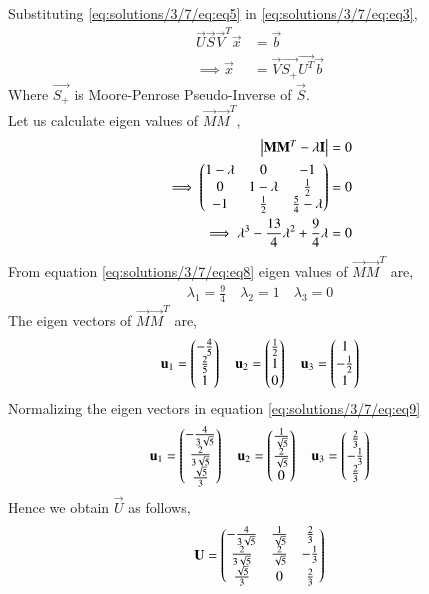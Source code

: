 Substituting \eqref{eq:solutions/3/7/eq:eq5} in \eqref{eq:solutions/3/7/eq:eq3},
\begin{align}
\vec{U}\vec{S}\vec{V}^T\vec{x} & = \vec{b}\\
\implies\vec{x} &= \vec{V}\vec{S_+}\vec{U^T}\vec{b}\label{eq:solutions/3/7/eq:eq7}
\end{align}
Where $\vec{S_+}$ is Moore-Penrose Pseudo-Inverse of $\vec{S}$. \\
Let us calculate eigen values of $\vec{M}\vec{M}^T$,
\begin{align}
\begin{vmatrix}\mathbf{M}\mathbf{M}^T - \lambda\mathbf{I}\end{vmatrix} &= 0\\
\implies\begin{pmatrix}1-\lambda&0&-1\\0&1-\lambda&\frac{1}{2}\\-1&\frac{1}{2}&\frac{5}{4}-\lambda\end{pmatrix} &=0\\
\implies\lambda^3-\frac{13}{4}\lambda^2+\frac{9}{4}\lambda &=0 \label{eq:solutions/3/7/eq:eq8}
\end{align}
From equation \eqref{eq:solutions/3/7/eq:eq8} eigen values of $\vec{M}\vec{M}^T$ are,
\begin{align}
\lambda_1 = \frac{9}{4} \quad
\lambda_2 = 1 \quad
\lambda_3 = 0
\end{align}
The eigen vectors of $\vec{M}\vec{M}^T$ are,
\begin{align}
\mathbf{u}_1=\begin{pmatrix}-\frac{4}{5}\\\frac{2}{5}\\1\end{pmatrix}\quad
\mathbf{u}_2=\begin{pmatrix}\frac{1}{2}\\1\\0\end{pmatrix}\quad
\mathbf{u}_3=\begin{pmatrix}1\\-\frac{1}{2}\\1\end{pmatrix}\label{eq:solutions/3/7/eq:eq9}
\end{align}
Normalizing the eigen vectors in equation \eqref{eq:solutions/3/7/eq:eq9}
\begin{align}
\mathbf{u}_1=\begin{pmatrix}-\frac{4}{3\sqrt{5}}\\\frac{2}{3\sqrt{5}}\\\frac{\sqrt{5}}{3}\end{pmatrix}\quad
\mathbf{u}_2=\begin{pmatrix}\frac{1}{\sqrt{5}}\\\frac{2}{\sqrt{5}}\\0\end{pmatrix}\quad
\mathbf{u}_3=\begin{pmatrix}\frac{2}{3}\\-\frac{1}{3}\\\frac{2}{3}\end{pmatrix}
\end{align}
Hence we obtain $\vec{U}$ as follows,
\begin{align}
\mathbf{U}=\begin{pmatrix}-\frac{4}{3\sqrt{5}}&\frac{1}{\sqrt{5}}&\frac{2}{3}\\\frac{2}{3\sqrt{5}}&\frac{2}{\sqrt{5}}&-\frac{1}{3}\\\frac{\sqrt{5}}{3}&0&\frac{2}{3}\end{pmatrix}\label{eq:solutions/3/7/eq:eq10}
\end{align}
